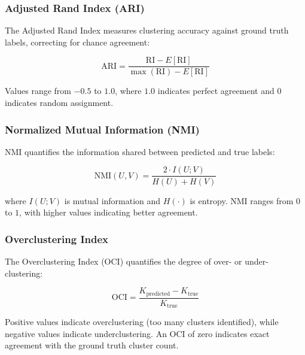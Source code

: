 \subsubsection{Adjusted Rand Index (ARI)}

The Adjusted Rand Index measures clustering accuracy against ground truth labels, correcting for chance agreement:

\begin{equation}
    \text{ARI} = \frac{\text{RI} - E[\text{RI}]}{\max(\text{RI}) - E[\text{RI}]}
\end{equation}

Values range from $-0.5$ to $1.0$, where $1.0$ indicates perfect agreement and $0$ indicates random assignment.

\subsubsection{Normalized Mutual Information (NMI)}

NMI quantifies the information shared between predicted and true labels:

\begin{equation}
    \text{NMI}(U, V) = \frac{2 \cdot I(U; V)}{H(U) + H(V)}
\end{equation}

where $I(U; V)$ is mutual information and $H(\cdot)$ is entropy. NMI ranges from $0$ to $1$, with higher values indicating better agreement.

\subsubsection{Overclustering Index}

The Overclustering Index (OCI) quantifies the degree of over- or under-clustering:

\begin{equation}
    \text{OCI} = \frac{K_{\text{predicted}} - K_{\text{true}}}{K_{\text{true}}}
\end{equation}

Positive values indicate overclustering (too many clusters identified), while negative values indicate underclustering. An OCI of zero indicates exact agreement with the ground truth cluster count.
